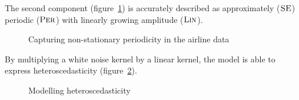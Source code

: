 \documentclass[letterpaper]{article}
\begin{document}
The second component (figure~\ref{fig:lin_periodic}) is accurately described as approximately (${\textsc{SE}}$) periodic (${\textsc{Per}}$) with linearly growing amplitude (${\textsc{Lin}}$).
%
\begin{figure}[h]
\centering
{}
\caption{Capturing non-stationary periodicity in the airline data}
\label{fig:lin_periodic}
\end{figure}
%
%
%
By multiplying a white noise kernel by a linear kernel, the model is able to express heteroscedasticity (figure~\ref{fig:heteroscedastic}).
%
\begin{figure}[h]
\centering
{}
\caption{Modelling heteroscedasticity}
\label{fig:heteroscedastic}
\end{figure}
\end{document}
